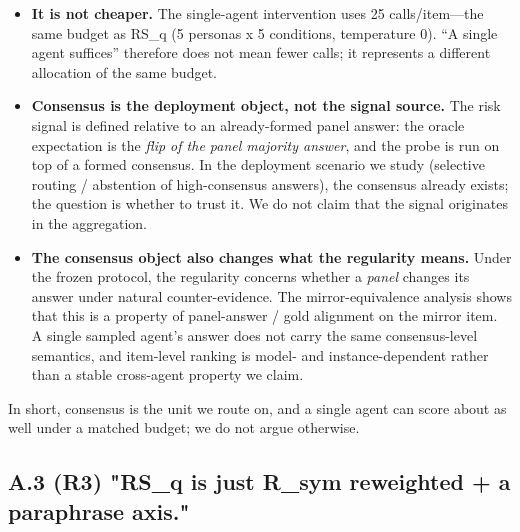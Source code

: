 \documentclass[11pt]{article}
\begin{document}
\begin{itemize}
  \item \textbf{It is not cheaper.} The single-agent intervention uses 25 calls/item—the same budget as RS\_q (5 personas x 5 conditions, temperature 0). “A single agent suffices” therefore does not mean fewer calls; it represents a different allocation of the same budget.
  \item \textbf{Consensus is the deployment object, not the signal source.} The risk signal is defined relative to an already-formed panel answer: the oracle expectation is the \emph{flip of the panel majority answer}, and the probe is run on top of a formed consensus. In the deployment scenario we study (selective routing / abstention of high-consensus answers), the consensus already exists; the question is whether to trust it. We do not claim that the signal originates in the aggregation.
  \item \textbf{The consensus object also changes what the regularity means.} Under the frozen protocol, the regularity concerns whether a \emph{panel} changes its answer under natural counter-evidence. The mirror-equivalence analysis shows that this is a property of panel-answer / gold alignment on the mirror item. A single sampled agent's answer does not carry the same consensus-level semantics, and item-level ranking is model- and instance-dependent rather than a stable cross-agent property we claim.
\end{itemize}

In short, consensus is the unit we route on, and a single agent can score about as well under a matched budget; we do not argue otherwise.

\subsection{A.3 (R3) "RS\_q is just R\_sym reweighted + a paraphrase axis."}
\end{document}
